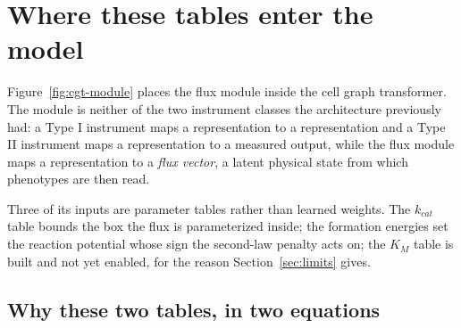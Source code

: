 
\section{Where these tables enter the model}

Figure~\ref{fig:cgt-module} places the flux module inside the cell graph transformer. The
module is neither of the two instrument classes the architecture previously had: a Type I
instrument maps a representation to a representation and a Type II instrument maps a
representation to a measured output, while the flux module maps a representation to a
\emph{flux vector}, a latent physical state from which phenotypes are then read.

Three of its inputs are parameter tables rather than learned weights. The $k_{cat}$ table
bounds the box the flux is parameterized inside; the formation energies set the reaction
potential whose sign the second-law penalty acts on; the $K_M$ table is built and not yet
enabled, for the reason Section~\ref{sec:limits} gives.

\subsection{Why these two tables, in two equations}

